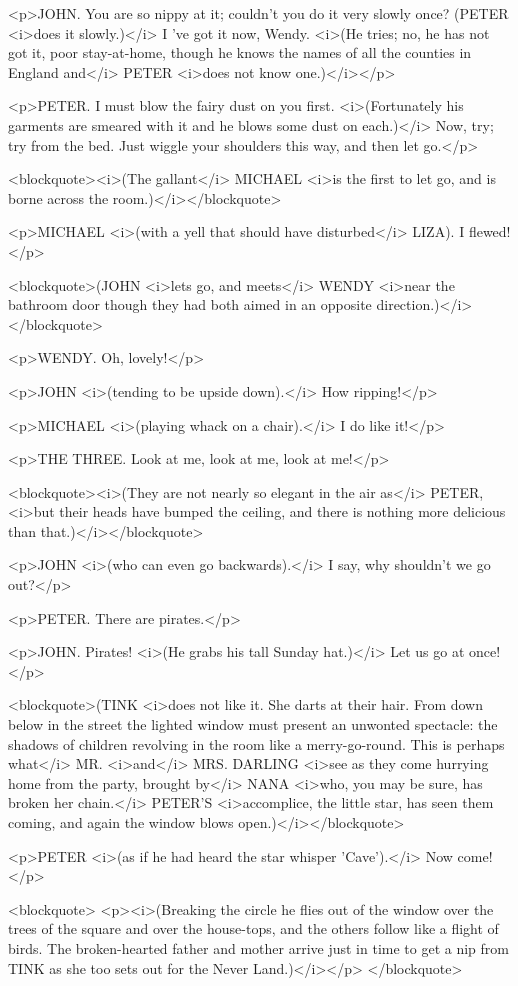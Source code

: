 <p>JOHN. You are so nippy at it; couldn't you do it very slowly once? (PETER <i>does it slowly.)</i> I 've got it now, Wendy. <i>(He tries; no, he has not got it, poor stay-at-home, though he knows the names of all the counties in England and</i> PETER <i>does not know one.)</i></p>

<p>PETER. I must blow the fairy dust on you first. <i>(Fortunately his garments are smeared with it and he blows some dust on each.)</i> Now, try; try from the bed. Just wiggle your shoulders this way, and then let go.</p>

<blockquote><i>(The gallant</i> MICHAEL <i>is the first to let go, and is borne across the room.)</i></blockquote>

<p>MICHAEL <i>(with a yell that should have disturbed</i> LIZA). I flewed!</p>

<blockquote>(JOHN <i>lets go, and meets</i> WENDY <i>near the bathroom door though they had both aimed in an opposite direction.)</i></blockquote>

<p>WENDY. Oh, lovely!</p>

<p>JOHN <i>(tending to be upside down).</i> How ripping!</p>

<p>MICHAEL <i>(playing whack on a chair).</i> I do like it!</p>

<p>THE THREE. Look at me, look at me, look at me!</p>

<blockquote><i>(They are not nearly so elegant in the air as</i> PETER, <i>but their heads have bumped the ceiling, and there is nothing more delicious than that.)</i></blockquote>

<p>JOHN <i>(who can even go backwards).</i> I say, why shouldn't we go out?</p>

<p>PETER. There are pirates.</p>

<p>JOHN. Pirates! <i>(He grabs his tall Sunday hat.)</i> Let us go at once!</p>

<blockquote>(TINK <i>does not like it. She darts at their hair. From down below in the street the lighted window must present an unwonted spectacle: the shadows of children revolving in the room like a merry-go-round. This is perhaps what</i> MR. <i>and</i> MRS. DARLING <i>see as they come hurrying home from the party, brought by</i> NANA <i>who, you may be sure, has broken her chain.</i> PETER'S <i>accomplice, the little star, has seen them coming, and again the window blows open.)</i></blockquote>

<p>PETER <i>(as if he had heard the star whisper 'Cave').</i> Now come!</p>

<blockquote> <p><i>(Breaking the circle he flies out of the window over the trees of the square and over the house-tops, and the others follow like a flight of birds. The broken-hearted father and mother arrive just in time to get a nip from TINK as she too sets out for the Never Land.)</i></p> </blockquote>
